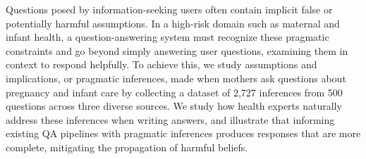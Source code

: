 Questions posed by information-seeking users often contain implicit false or potentially harmful assumptions. In a high-risk domain such as maternal and infant health, a question-answering system must recognize these pragmatic constraints and go beyond simply answering user questions, examining them in context to respond helpfully. To achieve this, we study assumptions and implications, or pragmatic inferences, made when mothers ask questions about pregnancy and infant care by collecting a dataset of 2,727 inferences from 500 questions across three diverse sources. We study how health experts naturally address these inferences when writing answers, and  illustrate that informing  existing QA pipelines with pragmatic inferences produces responses that are more complete, mitigating the propagation of harmful beliefs.